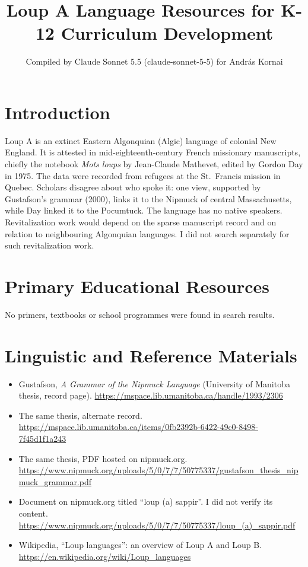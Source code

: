 \documentclass[12pt]{article}
\title{Loup A Language Resources for K-12 Curriculum Development}
\author{Compiled by Claude Sonnet 5.5 (claude-sonnet-5-5) for Andr\'as Kornai}
\date{}
\begin{document}
\maketitle

\section{Introduction}
Loup A is an extinct Eastern Algonquian (Algic) language of colonial New England. It is attested in mid-eighteenth-century French missionary manuscripts, chiefly the notebook \emph{Mots loups} by Jean-Claude Mathevet, edited by Gordon Day in 1975. The data were recorded from refugees at the St.\ Francis mission in Quebec. Scholars disagree about who spoke it: one view, supported by Gustafson's grammar (2000), links it to the Nipmuck of central Massachusetts, while Day linked it to the Pocumtuck. The language has no native speakers. Revitalization work would depend on the sparse manuscript record and on relation to neighbouring Algonquian languages. I did not search separately for such revitalization work.

\section{Primary Educational Resources}
No primers, textbooks or school programmes were found in search results.

\section{Linguistic and Reference Materials}
\begin{itemize}
\item Gustafson, \emph{A Grammar of the Nipmuck Language} (University of Manitoba thesis, record page). \url{https://mspace.lib.umanitoba.ca/handle/1993/2306}
\item The same thesis, alternate record. \url{https://mspace.lib.umanitoba.ca/items/0fb2392b-6422-49c0-8498-7f45d1f1a243}
\item The same thesis, PDF hosted on nipmuck.org. \url{https://www.nipmuck.org/uploads/5/0/7/7/50775337/gustafson_thesis_nipmuck_grammar.pdf}
\item Document on nipmuck.org titled ``loup (a) sappir''. I did not verify its content. \url{https://www.nipmuck.org/uploads/5/0/7/7/50775337/loup_(a)_sappir.pdf}
\item Wikipedia, ``Loup languages'': an overview of Loup A and Loup B. \url{https://en.wikipedia.org/wiki/Loup_languages}
\end{itemize}
\end{document}
